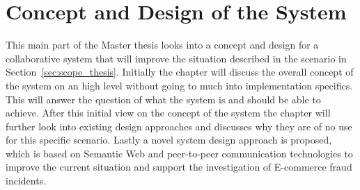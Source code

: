 
\chapter{Concept and Design of the System} %
\label{cha:design_system}

This main part of the Master thesis looks into a concept and design for a collaborative system that will improve the situation described in the scenario in Section~\ref{sec:scope_thesis}. Initially the chapter will discuss the overall concept of the system on an high level without going to much into implementation specifics. This will answer the question of what the system is and should be able to achieve. After this initial view on the concept of the system the chapter will further look into existing design approaches and discusses why they are of no use for this specific scenario. Lastly a novel system design approach is proposed, which is based on Semantic Web and peer-to-peer communication technologies to improve the current situation and support the investigation of E-commerce fraud incidents.







